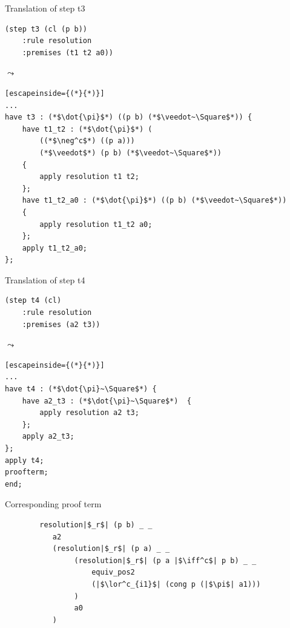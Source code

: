 \documentclass[aspectratio=169,xcolor={dvipsnames}]{beamer}
\begin{document}
\begin{frame}[fragile]{Translation of step t3}
\noindent\begin{minipage}{.35\textwidth}
\begin{verbatim}
(step t3 (cl (p b)) 
    :rule resolution
    :premises (t1 t2 a0))
\end{verbatim}
\end{minipage}
$\leadsto$\hfill \begin{minipage}{.55\textwidth}
\begin{lstlisting}[escapeinside={(*}{*)}]
...
have t3 : (*$\dot{\pi}$*) ((p b) (*$\veedot~\Square$*)) {
    have t1_t2 : (*$\dot{\pi}$*) (
        ((*$\neg^c$*) ((p a))) 
        (*$\veedot$*) (p b) (*$\veedot~\Square$*))
    {
        apply resolution t1 t2;
    };
    have t1_t2_a0 : (*$\dot{\pi}$*) ((p b) (*$\veedot~\Square$*))
    {
        apply resolution t1_t2 a0;
    };
    apply t1_t2_a0;
};
\end{lstlisting}
\end{minipage}
\end{frame}
    

\begin{frame}[fragile]{Translation of step t4}
\noindent\begin{minipage}{.35\textwidth}
\begin{verbatim}
(step t4 (cl)
    :rule resolution
    :premises (a2 t3))
\end{verbatim}
\end{minipage}
$\leadsto$\hfill\begin{minipage}{.55\textwidth}
\begin{lstlisting}[escapeinside={(*}{*)}]
...
have t4 : (*$\dot{\pi}~\Square$*) {
    have a2_t3 : (*$\dot{\pi}~\Square$*)  {
        apply resolution a2 t3;
    };
    apply a2_t3;
};
apply t4;
proofterm;
end;
\end{lstlisting}
\end{minipage}
\end{frame}


\begin{frame}[fragile]{Corresponding proof term}
    \begin{verbatim}
        resolution|$_r$| (p b) _ _
           a2
           (resolution|$_r$| (p a) _ _
                (resolution|$_r$| (p a |$\iff^c$| p b) _ _
                    equiv_pos2
                    (|$\lor^c_{i1}$| (cong p (|$\pi$| a1)))
                )
                a0
           )

    \end{verbatim}
\end{frame}
\end{document}
